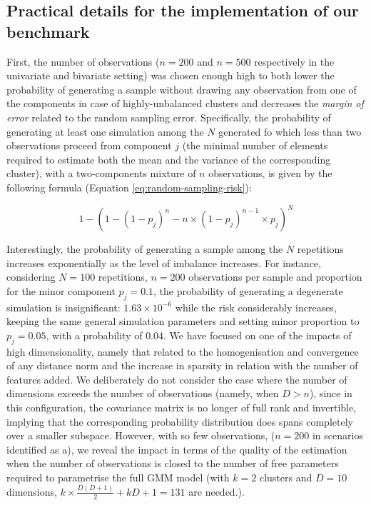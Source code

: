\color{black}

\hypertarget{practical-details-for-the-implementation-of-our-benchmark}{%
\subsection{Practical details for the implementation of our benchmark}\label{practical-details-for-the-implementation-of-our-benchmark}}

\label{subsec:benchmark-details}

First, the number of observations (\(n=200\) and \(n=500\) respectively in the univariate and bivariate setting) was chosen enough high to both lower the probability of generating a sample without drawing any observation from one of the components in case of highly-unbalanced clusters and decreases the \emph{margin of error} related to the random sampling error. Specifically, the probability of generating at least one simulation among the \(N\) generated fo which less than two observations proceed from component \(j\) (the minimal number of elements required to estimate both the mean and the variance of the corresponding cluster), with a two-components mixture of \(n\) observations, is given by the following formula (Equation \eqref{eq:random-sampling-risk}):

\begin{equation}
1 - \left(1 - (1-p_j)^n - n \times (1-p_j)^{n-1}\times p_j\right)^N
\label{eq:random-sampling-risk}
\end{equation}

Interestingly, the probability of generating a sample among the \(N\) repetitions increases exponentially as the level of imbalance increases. For instance, considering \(N=100\) repetitions, \(n=200\) observations per sample and proportion for the minor component \(p_j=0.1\), the probability of generating a degenerate simulation is insignificant: \(1.63 \times 10^{-6}\) while the risk considerably increases, keeping the same general simulation parameters and setting minor proportion to \(p_j=0.05\), with a probability of \(0.04\). \color{blue} We have focused on one of the impacts of high dimensionality, namely that related to the homogenisation and convergence of any distance norm and the increase in sparsity in relation with the number of features added. We deliberately do not consider the case where the number of dimensions exceeds the number of observations (namely, when \(D>n\)), since in this configuration, the covariance matrix is no longer of full rank and invertible, implying that the corresponding probability distribution does spans completely over a smaller subspace. However, with so few observations, (\(n=200\) in scenarios identified as a), we reveal the impact in terms of the quality of the estimation when the number of observations is closed to the number of free parameters required to parametrise the full GMM model (with \(k=2\) clusters and \(D=10\) dimensions, \(k \times \frac{D(D+1)}{2} + kD + 1 = 131\) are needed.).\color{black}

